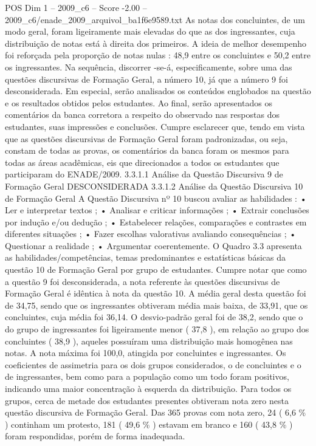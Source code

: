 \begin{textsample}{POS Dim 1 – 2009\_c6 – Score -2.00 – 2009\_c6/enade\_2009\_arquivol\_ba1f6e9589.txt}
As notas dos concluintes, de um modo geral, foram ligeiramente mais elevadas do que as dos ingressantes, cuja distribuição de notas está à direita dos primeiros.
A ideia de melhor desempenho foi reforçada pela proporção de notas nulas : 48,9 entre os concluintes e 50,2 entre os ingressantes.
Na sequência, discorrer -se-á, especificamente, sobre uma das questões discursivas de Formação Geral, a número 10, já que a número 9 foi desconsiderada.
Em especial, serão analisados os conteúdos englobados na questão e os resultados obtidos pelos estudantes.
Ao final, serão apresentados os comentários da banca corretora a respeito do observado nas respostas dos estudantes, suas impressões e conclusões.
Cumpre esclarecer que, tendo em vista que as questões discursivas de Formação Geral foram padronizadas, ou seja, constam de todas as provas, os comentários da banca foram os mesmos para todas as áreas acadêmicas, eis que direcionados a todos os estudantes que participaram do ENADE/2009. 3.3.1.1 Análise da Questão Discursiva 9 de Formação Geral DESCONSIDERADA 3.3.1.2 Análise da Questão Discursiva 10 de Formação Geral A Questão Discursiva nº 10 buscou avaliar as habilidades : • Ler e interpretar textos ; • Analisar e criticar informações ; • Extrair conclusões por indução e/ou dedução ; • Estabelecer relações, comparações e contrastes em diferentes situações ; • Fazer escolhas valorativas avaliando consequências ; • Questionar a realidade ; • Argumentar coerentemente.
O Quadro 3.3 apresenta as habilidades/competências, temas predominantes e estatísticas básicas da questão 10 de Formação Geral por grupo de estudantes.
Cumpre notar que como a questão 9 foi desconsiderada, a nota referente às questões discursivas de Formação Geral é idêntica à nota da questão 10.
A média geral desta questão foi de 34,75, sendo que os ingressantes obtiveram média mais baixa, de 33,91, que os concluintes, cuja média foi 36,14.
O desvio-padrão geral foi de 38,2, sendo que o do grupo de ingressantes foi ligeiramente menor ( 37,8 ), em relação ao grupo dos concluintes ( 38,9 ), aqueles possuíram uma distribuição mais homogênea nas notas.
A nota máxima foi 100,0, atingida por concluintes e ingressantes.
Os coeficientes de assimetria para os dois grupos considerados, o de concluintes e o de ingressantes, bem como para a população como um todo foram positivos, indicando uma maior concentração à esquerda da distribuição.
Para todos os grupos, cerca de metade dos estudantes presentes obtiveram nota zero nesta questão discursiva de Formação Geral.
Das 365 provas com nota zero, 24 ( 6,6 \% ) continham um protesto, 181 ( 49,6 \% ) estavam em branco e 160 ( 43,8 \% ) foram respondidas, porém de forma inadequada.

\end{textsample}
